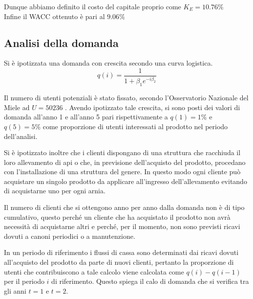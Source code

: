 Dunque abbiamo definito il costo del capitale proprio come $K_E = 10.76\%$\\
Infine il WACC ottenuto è pari al $9.06\%$
\subsection{Analisi della domanda} \label{sec:domanda}
Si è ipotizzata una domanda con crescita secondo una curva logistica. 
\begin{displaymath}
q(i) = \frac{1}{1 + \beta_1 e^{-i\beta_2}}
\end{displaymath}

Il numero di utenti potenziali è stato fissato, secondo l'Osservatorio Nazionale
del Miele ad $U=50236$ \cite{miele}.
Avendo ipotizzato tale crescita, si sono posti dei valori di domanda all'anno 1
e all'anno 5 pari rispettivamente a $q(1)=1\%$ e $q(5)=5\%$ come proporzione di 
utenti interessati al prodotto nel periodo dell'analisi.  

Si è ipotizzato inoltre che i clienti dispongano di una struttura che
racchiuda il loro allevamento di api o che, in previsione dell’acquisto del
prodotto, procedano con l’installazione di una struttura del genere. In
questo modo ogni cliente può acquistare un singolo prodotto da applicare
all’ingresso dell’allevamento evitando di acquistarne uno per ogni arnia.

Il numero di clienti che si ottengono anno per anno dalla domanda non è di tipo
cumulativo, questo perché un cliente che ha acquistato il prodotto non
avrà necessità di acquistarne altri e perché, per il momento, non sono previsti
ricavi dovuti a canoni periodici o a manutenzione. 

In un periodo di riferimento i flussi di cassa sono determinati dai ricavi
dovuti all’acquisto del prodotto da parte di nuovi clienti, pertanto la
proporzione di utenti che contribuiscono a tale calcolo viene calcolata come
$q(i) - q(i-1)$ per il periodo $i$ di riferimento.
Questo spiega il calo di domanda che si verifica tra gli anni $t=1$ e $t=2$.

